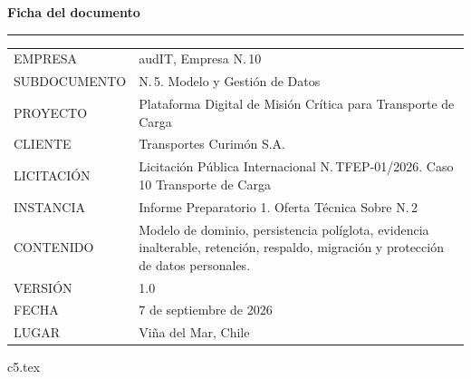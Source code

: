 \documentclass[12pt, letterpaper, table, xcdraw]{inf-pucv}
\begin{document}

\thispagestyle{empty}
\vspace*{1.2cm}
{\color{audITnavy}\fontsize{28}{32}\selectfont\bfseries Ficha del documento}

\vspace{10pt}
{\color{audITteal}\rule{\linewidth}{2pt}}

\vspace{22pt}
{\small
\begin{longtable}{@{}p{3.5cm}p{10.5cm}@{}}
\color{audITgris}EMPRESA & \color{black}audIT, Empresa N.\textordmasculine{}\,10 \\
\color{audITgris}SUBDOCUMENTO & \color{black}N.\textordmasculine{}\,5. Modelo y Gestión de Datos \\
\color{audITgris}PROYECTO & \color{black}Plataforma Digital de Misión Crítica para Transporte de Carga \\
\color{audITgris}CLIENTE & \color{black}Transportes Curimón S.A. \\
\color{audITgris}LICITACIÓN & \color{black}Licitación Pública Internacional N.\textordmasculine{}\,TFEP-01/2026. Caso 10 Transporte de Carga \\
\color{audITgris}INSTANCIA & \color{black}Informe Preparatorio 1. Oferta Técnica Sobre N.\textordmasculine{}\,2 \\
\color{audITgris}CONTENIDO & \color{black}Modelo de dominio, persistencia políglota, evidencia inalterable, retención, respaldo, migración y protección de datos personales. \\
\color{audITgris}VERSIÓN & \color{black}1.0 \\
\color{audITgris}FECHA & \color{black}7 de septiembre de 2026 \\
\color{audITgris}LUGAR & \color{black}Viña del Mar, Chile \\
\end{longtable}}
\clearpage

\setcounter{page}{1}
\renewcommand{\contentsname}{Índice}
\tableofcontents
\clearpage

{c5.tex}

\clearpage
{}
{}
\printbibliography[title={Bibliografía}]
\end{document}
